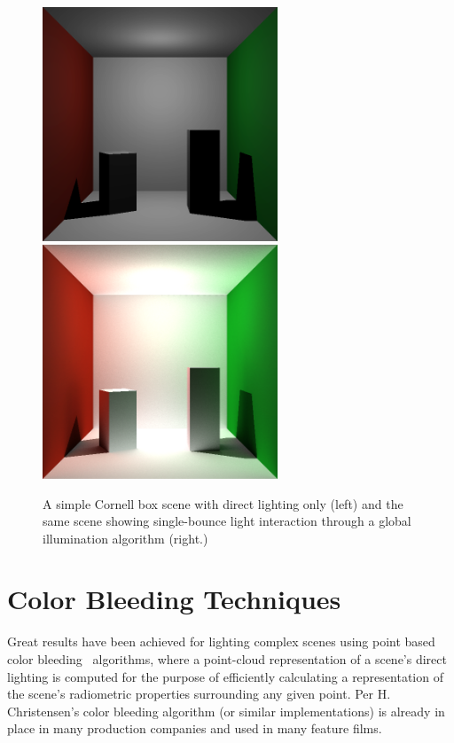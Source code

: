 \documentclass[12pt]{ucthesis}
\newcommand{\captionfonts}{\small\bf\ssp}
\begin{document}
\begin{figure}[h!]
    \centering
    \includegraphics[width=70mm]{img/boxes_noindirect.png}
    \includegraphics[width=70mm]{img/indirect_box_high.png}
    \captionfonts
    \caption{A simple Cornell box scene with direct lighting only (left) and the same scene showing single-bounce light interaction through a global illumination algorithm (right.)}
    \label{fig:cornell}
\end{figure}

\section{Color Bleeding Techniques}

Great results have been achieved for lighting complex scenes using point based color bleeding~\cite{christensen:2008} algorithms, where a point-cloud representation of a scene's direct lighting is computed for the purpose of efficiently calculating a representation of the scene's radiometric properties surrounding any given point.  Per H. Christensen's color bleeding algorithm (or similar implementations) is already in place in many production companies and used in many feature films.
\end{document}
